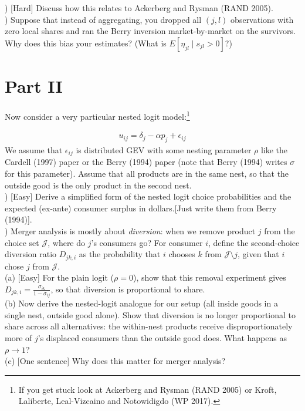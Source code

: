 \documentclass[12pt]{article}
\newcommand{\calJ}{\mathcal{J}}
\begin{document}
) [Hard] Discuss how this relates to Ackerberg and Rysman (RAND 2005).\\

) Suppose that instead of aggregating, you dropped all $(j,l)$ observations with zero local shares and ran the Berry inversion market-by-market on the survivors. Why does this bias your estimates? (What is $E[\eta_{jl} \mid s_{jl} > 0]$?)


\section*{\normalsize Part II}
Now consider a very particular nested logit model:\footnote{If you get stuck look at Ackerberg and Rysman (RAND 2005) or Kroft, Laliberte, Leal-Vizcaino and Notowidigdo (WP 2017).}

\begin{eqnarray*}
u_{ij} = \delta_j - \alpha p_j + \epsilon_{ij}
\end{eqnarray*}
We assume that $\epsilon_{ij}$ is distributed GEV with some nesting parameter $\rho$ like the Cardell (1997) paper or the Berry (1994) paper (note that Berry (1994) writes $\sigma$ for this parameter). Assume that all products are in the same nest, so that the outside good is the only product in the second nest.\\

) [Easy] Derive a simplified form of the nested logit choice probabilities and the expected (ex-ante) consumer surplus in dollars.[Just write them from Berry (1994)].\\

) Merger analysis is mostly about \textit{diversion}: when we remove product $j$ from the choice set $\calJ$, where do $j$'s consumers go? For consumer $i$, define the second-choice diversion ratio $D_{jk,i}$ as the probability that $i$ chooses $k$ from $\calJ \setminus j$, given that $i$ chose $j$ from $\calJ$.\\
(a) [Easy] For the plain logit ($\rho = 0$), show that this removal experiment gives $D_{jk,i} = \frac{\sigma_{ik}}{1-\sigma_{ij}}$, so that diversion is proportional to share.\\
(b) Now derive the nested-logit analogue for our setup (all inside goods in a single nest, outside good alone). Show that diversion is no longer proportional to share across all alternatives: the within-nest products receive disproportionately more of $j$'s displaced consumers than the outside good does. What happens as $\rho \rightarrow 1$?\\
(c) [One sentence] Why does this matter for merger analysis?\\
\end{document}
